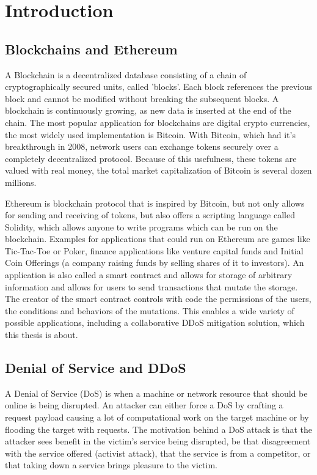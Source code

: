 \chapter{Introduction}

\section{Blockchains and Ethereum}

A Blockchain is a decentralized database consisting of a chain of cryptographically secured units, called 'blocks'. Each block references the previous block and cannot be modified without breaking the subsequent blocks. A blockchain is continuously growing, as new data is inserted at the end of the chain.
The most popular application for blockchains are digital crypto currencies, the most widely used implementation is Bitcoin. With Bitcoin, which had it's breakthrough in 2008, network users can exchange tokens securely over a completely decentralized protocol. Because of this usefulness, these tokens are valued with real money, the total market capitalization of Bitcoin is several dozen millions.
 
Ethereum \cite{Ethereum} is blockchain protocol that is inspired by Bitcoin, but not only allows for sending and receiving of tokens, but also offers a scripting language called Solidity, which allows anyone to write programs which can be run on the blockchain. Examples for applications that could run on Ethereum are games like Tic-Tac-Toe or Poker, finance applications like venture capital funds and Initial Coin Offerings (a company raising funds by selling shares of it to investors).
An application is also called a smart contract and allows for storage of arbitrary information and allows for users to send transactions that mutate the storage. The creator of the smart contract controls with code the permissions of the users, the conditions and behaviors of the mutations. This enables a wide variety of possible applications, including a collaborative DDoS mitigation solution, which this thesis is about.

\section{Denial of Service and DDoS}

A Denial of Service (DoS) is when a machine or network resource that should be online is being disrupted. An attacker can either force a DoS by crafting a request payload causing a lot of computational work on the target machine or by flooding the target with requests. The motivation behind a DoS attack is that the attacker sees benefit in the victim's service being disrupted, be that disagreement with the service offered (activist attack), that the service is from a competitor, or that taking down a service brings pleasure to the victim.

